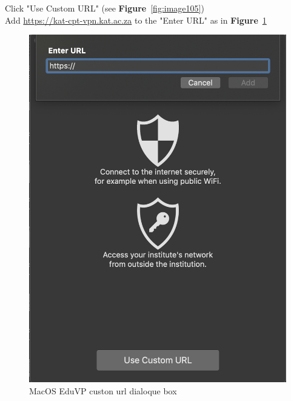 Click "Use Custom URL" (see \textbf{Figure}~\ref{fig:image105})\\
Add  \url{https://kat-cpt-vpn.kat.ac.za} to the "Enter URL" as in  \textbf{Figure}~\ref{fig:image74}


\begin{figure}[H]
	\centering
	\includegraphics[scale=0.4]{Chapters/images/image74.png}
	
	\caption{MacOS EduVP custon url dialoque box }
	\label{fig:image74}
\end{figure}








